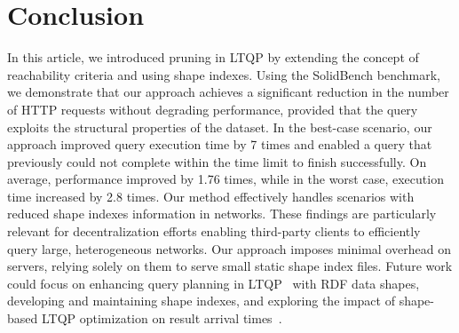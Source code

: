 \section{Conclusion}

In this article, we introduced pruning in LTQP by extending the concept of reachability criteria and using shape indexes.
Using the SolidBench benchmark, we demonstrate that our approach achieves a significant reduction in the number of HTTP requests without degrading performance, provided that the query exploits the structural properties of the dataset.
In the best-case scenario, our approach improved query execution time by 7 times and enabled a query that previously could not complete within the time limit to finish successfully.
On average, performance improved by 1.76 times, while in the worst case, execution time increased by 2.8 times.
Our method effectively handles scenarios with reduced shape indexes information in networks.
These findings are  particularly relevant for decentralization efforts enabling third-party clients to efficiently query large, heterogeneous networks.
Our approach imposes minimal overhead on servers, relying solely on them to serve small static shape index files.
Future work could focus on enhancing query planning in LTQP~\cite{taelman2024towards} with RDF data shapes, developing and maintaining shape indexes, and exploring the impact of shape-based LTQP optimization on result arrival times~\cite{Acosta2017}.

